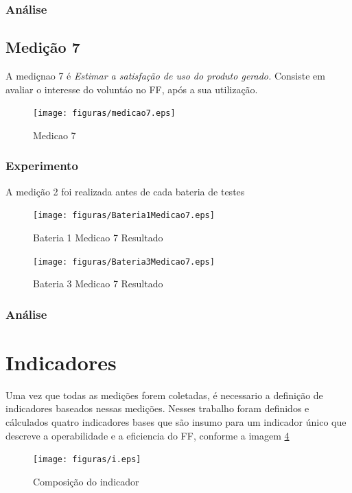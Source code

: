\subsubsection{Análise}


\subsection{Medição 7}

A mediçnao 7 é \textit{Estimar a satisfação de uso do produto gerado.} Consiste em avaliar o interesse do voluntáo no FF, após
a sua utilização.

\begin{figure}[H]
  \centering
  \label{fig:indicadores}
  \texttt{[image: figuras/medicao7.eps]}
  \caption{Medicao 7}
\end{figure}

\subsubsection{Experimento}

A medição 2 foi realizada antes de cada bateria de testes


\begin{figure}[H]
  \centering
  \label{fig:indicadores}
  \texttt{[image: figuras/Bateria1Medicao7.eps]}
  \caption{Bateria 1 Medicao 7 Resultado}
\end{figure}


\begin{figure}[H]
  \centering
  \label{fig:indicadores}
  \texttt{[image: figuras/Bateria3Medicao7.eps]}
  \caption{Bateria 3 Medicao 7 Resultado}
\end{figure}



\subsubsection{Análise}



\section{Indicadores}

Uma vez que todas as medições forem coletadas, é necessario a definição de indicadores baseados nessas medições.
Nesses trabalho foram definidos e cálculados quatro indicadores bases que são insumo para um indicador único que descreve
a operabilidade e a eficiencia do FF, conforme a imagem \ref{fig:indicadores}

\begin{figure}[H]
  \centering
  \label{fig:indicadores}
  \texttt{[image: figuras/i.eps]}
  \caption{Composição do indicador}
\end{figure}
